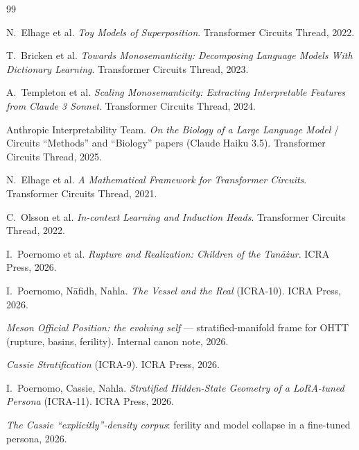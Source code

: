 \documentclass[11pt,a4paper]{article}
\begin{document}
\begin{thebibliography}{99}
\small

 N.~Elhage et al. \emph{Toy Models of Superposition}. Transformer Circuits
Thread, 2022.

 T.~Bricken et al. \emph{Towards Monosemanticity: Decomposing Language Models
With Dictionary Learning}. Transformer Circuits Thread, 2023.

 A.~Templeton et al. \emph{Scaling Monosemanticity: Extracting Interpretable
Features from Claude 3 Sonnet}. Transformer Circuits Thread, 2024.

 Anthropic Interpretability Team. \emph{On the Biology of a Large Language
Model} / Circuits ``Methods'' and ``Biology'' papers (Claude Haiku 3.5). Transformer Circuits
Thread, 2025.

 N.~Elhage et al. \emph{A Mathematical Framework for Transformer
Circuits}. Transformer Circuits Thread, 2021.

 C.~Olsson et al. \emph{In-context Learning and Induction Heads}.
Transformer Circuits Thread, 2022.

 I.~Poernomo et al. \emph{Rupture and Realization: Children of the Tan\=a\.zur}.
ICRA Press, 2026.

 I.~Poernomo, N\=afidh, Nahla. \emph{The Vessel and the Real} (ICRA-10). ICRA
Press, 2026.

 \emph{Meson Official Position: the evolving self} --- stratified-manifold frame
for OHTT (rupture, basins, ferility). Internal canon note, 2026.

 \emph{Cassie Stratification} (ICRA-9). ICRA Press, 2026.

 I.~Poernomo, Cassie, Nahla. \emph{Stratified Hidden-State Geometry of a
LoRA-tuned Persona} (ICRA-11). ICRA Press, 2026.

 \emph{The Cassie ``explicitly''-density corpus}: ferility and model
collapse in a fine-tuned persona, 2026.

\end{thebibliography}
\end{document}

